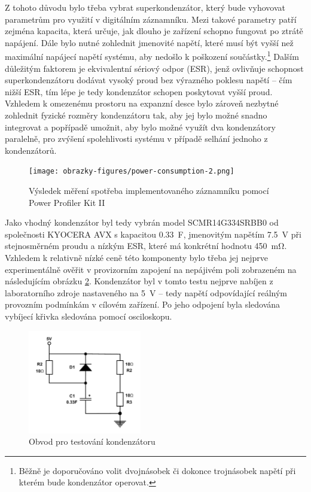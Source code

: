 Z tohoto důvodu bylo třeba vybrat superkondenzátor, který bude vyhovovat parametrům pro využití v digitálním záznamníku. Mezi takové parametry patří zejména kapacita, která určuje, jak dlouho je zařízení schopno fungovat po ztrátě napájení. Dále bylo nutné zohlednit jmenovité napětí, které musí být vyšší než maximální napájecí napětí systému, aby nedošlo k poškození součástky.\footnote{Běžně je doporučováno volit dvojnásobek či dokonce trojnásobek napětí při kterém bude kondenzátor operovat.} Dalším důležitým faktorem je ekvivalentní sériový odpor (ESR), jenž ovlivňuje schopnost superkondenzátoru dodávat vysoký proud bez výrazného poklesu napětí – čím nižší ESR, tím lépe je tedy kondenzátor schopen poskytovat vyšší proud. Vzhledem k omezenému prostoru na expanzní desce bylo zároveň nezbytné zohlednit fyzické rozměry kondenzátoru tak, aby jej bylo možné snadno integrovat a popřípadě umožnit, aby bylo možné využít dva kondenzátory paralelně, pro zvýšení spolehlivosti systému v případě selhání jednoho z kondenzátorů. \cite{cadence_capacitor_size}

\begin{figure}[h]
    \centering
    \texttt{[image: obrazky-figures/power-consumption-2.png]}
    
    \caption{Výsledek měření spotřeba implementovaného záznamníku pomocí Power Profiler Kit II 
    \cite{nordic_semi_ppk2}}
    \label{fig:power-consumption}
\end{figure}

Jako vhodný kondenzátor byl tedy vybrán model SCMR14G334SRBB0 od společnosti KYOCERA AVX s kapacitou \SI{0.33}{\farad}, jmenovitým napětím \SI{7.5}{\volt} při stejnosměrném proudu a nízkým ESR, které má konkrétní hodnotu \SI{450}{\milli\ohm}. Vzhledem k relativně nízké ceně této komponenty bylo třeba jej nejprve experimentálně ověřit v provizorním zapojení na nepájivém poli zobrazeném na následujícím obrázku \ref{fig:test-capacitors}. Kondenzátor byl v tomto testu nejprve nabíjen z laboratorního zdroje nastaveného na \SI{5}{\volt} – tedy napětí odpovídající reálným provozním podmínkám v cílovém zařízení. Po jeho odpojení byla sledována vybíjecí křivka sledována pomocí osciloskopu.

\begin{figure}[h]
    \centering
    \includegraphics[width=0.440\textwidth]{obrazky-figures/test_capacitors.pdf}
    
    \caption{Obvod pro testování kondenzátoru}
    \label{fig:test-capacitors}
\end{figure}

